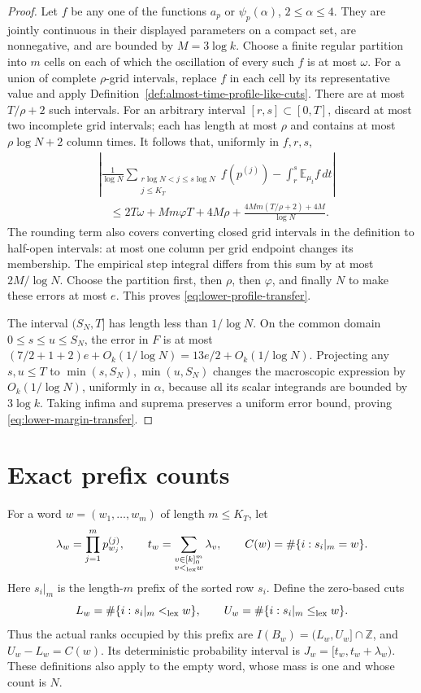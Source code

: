 \documentclass[11pt]{article}
\numberwithin{equation}{section}
\newcommand{\E}{\mathbb E}
\newcommand{\1}{\mathbf 1}
\begin{document}
\begin{proof}
Let $f$ be any one of the functions $a_p$ or $\psi_p(\alpha)$,
$2\le\alpha\le4$. They are jointly continuous in their displayed
parameters on a compact set, are nonnegative, and are bounded by
$M=3\log k$. Choose a finite regular partition into $m$ cells on each of
which the oscillation of every such $f$ is at most $\omega$.
For a union of complete $\rho$-grid intervals, replace $f$ in each cell by
its representative value and apply Definition~\ref{def:almost-time-profile-like-cuts}.
There are at most $T/\rho+2$ such intervals. For an arbitrary interval
$[r,s]\subset[0,T]$, discard at most two incomplete grid intervals;
each has length at most $\rho$ and contains at most $\rho\log N+2$
column times. It follows that, uniformly in $f,r,s$,
\begin{align*}
 &\left|\frac1{\log N}\sum_{\substack{r\log N<j\le s\log N\\j\le K_T}}
 f(p^{(j)})-\int_r^s\E_{\mu_t}f\,dt\right|\\
 &\quad\le 2T\omega+Mm\varphi T+4M\rho
          +\frac{4Mm(T/\rho+2)+4M}{\log N}.
\end{align*}
The rounding term also covers converting closed grid intervals in the
definition to half-open intervals: at most one column per grid endpoint
changes its membership. The empirical step integral differs from this
sum by at most $2M/\log N$. Choose the partition first, then $\rho$,
then $\varphi$, and finally $N$ to make these errors at most $e$.
This proves \eqref{eq:lower-profile-transfer}.

The interval $(S_N,T]$ has length less than $1/\log N$.
On the common domain $0\le s\le u\le S_N$, the error in $F$ is at most
$(7/2+1+2)e+O_k(1/\log N)=13e/2+O_k(1/\log N)$.
Projecting any $s,u\le T$ to $\min(s,S_N),\min(u,S_N)$ changes the
macroscopic expression by $O_k(1/\log N)$, uniformly in $\alpha$,
because all its scalar integrands are bounded by $3\log k$.
Taking infima and suprema preserves a uniform error bound, proving
\eqref{eq:lower-margin-transfer}.
\end{proof}

\section{Exact prefix counts}

For a word \(w=(w_1,\ldots,w_m)\) of length \(m\le K_T\), let
\[
 \lambda_w=\prod_{j=1}^m p^{(j)}_{w_j},\qquad
 t_w=\sum_{\substack{v\in[k]_0^m\\v<_{\rm lex}w}}\lambda_v,
 \qquad C(w)=\#\{i:s_i|_m=w\}.
\]
Here \(s_i|_m\) is the length-\(m\) prefix of the sorted row \(s_i\).
Define the zero-based cuts
\[
 L_w=\#\{i:s_i|_m<_{\rm lex}w\},\qquad
 U_w=\#\{i:s_i|_m\le_{\rm lex}w\}.
\]
Thus the actual ranks occupied by this prefix are
\(I(B_w)=(L_w,U_w]\cap\mathbb Z\), and \(U_w-L_w=C(w)\).
Its deterministic probability interval is
\(J_w=[t_w,t_w+\lambda_w)\). These definitions also apply to the empty
word, whose mass is one and whose count is \(N\).
\end{document}
